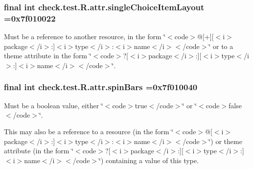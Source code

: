\subsubsection[{single\+Choice\+Item\+Layout}]{\setlength{\rightskip}{0pt plus 5cm}final int check.\+test.\+R.\+attr.\+single\+Choice\+Item\+Layout =0x7f010022\hspace{0.3cm}{\ttfamily [static]}}\label{classcheck_1_1test_1_1_r_1_1attr_adf3a7eab0f546f495a660d306b9f17fd}
Must be a reference to another resource, in the form \char`\"{}$<$code$>$@\mbox{[}+\mbox{]}\mbox{[}$<$i$>$package$<$/i$>$\+:\mbox{]}$<$i$>$type$<$/i$>$\+:$<$i$>$name$<$/i$>$$<$/code$>$\char`\"{} or to a theme attribute in the form \char`\"{}$<$code$>$?\mbox{[}$<$i$>$package$<$/i$>$\+:\mbox{]}\mbox{[}$<$i$>$type$<$/i$>$\+:\mbox{]}$<$i$>$name$<$/i$>$$<$/code$>$\char`\"{}. \hypertarget{classcheck_1_1test_1_1_r_1_1attr_a36af18fcdeac8b37c27afbf2e44385bf}{}
\subsubsection[{spin\+Bars}]{\setlength{\rightskip}{0pt plus 5cm}final int check.\+test.\+R.\+attr.\+spin\+Bars =0x7f010040\hspace{0.3cm}{\ttfamily [static]}}\label{classcheck_1_1test_1_1_r_1_1attr_a36af18fcdeac8b37c27afbf2e44385bf}
Must be a boolean value, either \char`\"{}$<$code$>$true$<$/code$>$\char`\"{} or \char`\"{}$<$code$>$false$<$/code$>$\char`\"{}. 

This may also be a reference to a resource (in the form \char`\"{}$<$code$>$@\mbox{[}$<$i$>$package$<$/i$>$\+:\mbox{]}$<$i$>$type$<$/i$>$\+:$<$i$>$name$<$/i$>$$<$/code$>$\char`\"{}) or theme attribute (in the form \char`\"{}$<$code$>$?\mbox{[}$<$i$>$package$<$/i$>$\+:\mbox{]}\mbox{[}$<$i$>$type$<$/i$>$\+:\mbox{]}$<$i$>$name$<$/i$>$$<$/code$>$\char`\"{}) containing a value of this type. \hypertarget{classcheck_1_1test_1_1_r_1_1attr_a020a7df4dde5cf057bd1e5101a5782dc}{}
